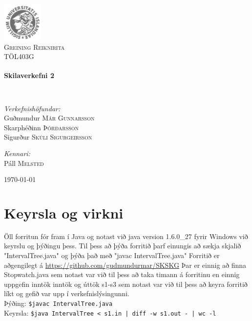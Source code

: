 \documentclass{article}
\begin{document}
\begin {titlepage}
\begin{center}
\includegraphics[width=0.15\textwidth]{./Haskoli_Islands_rett.jpg}~\\[1cm]

\textsc{\LARGE Greining Reiknirita}\\[1.5cm]

\textsc{\Large TÖL403G}\\[0.5cm]

\HRule \\[0.4cm]
{ \huge \bfseries Skilaverkefni 2\\[0.4cm] }

\HRule \\[1.5cm]

\begin{minipage}{0.5\textwidth}
\begin{flushleft} \large
\emph{Verkefnishöfundar:}
\\ Guðmundur\textsc{ Már Gunnarsson }
\\ Skarphéðinn \textsc{Þórðarsson}
\\ Sigurður \textsc{Skúli Sigurgeirsson}

\end{flushleft}
\end{minipage}
\begin{minipage}{0.4\textwidth}
\begin{flushright} \large
\emph{Kennari:} \\
Páll \textsc{Melsted}
\end{flushright}
\end{minipage}

\vfill

{\large \today}

\end{center}

\end{titlepage}

\section {Keyrsla og virkni}
Öll forritun fór fram í Java og notast við java version 1.6.0\_27 fyrir Windows við keyrslu og þýðingu þess. 
Til þess að þýða forritið þarf einungis að sækja skjalið "IntervalTree.java" og þýða það með "javac IntervalTree.java"
Forritið er aðgengilegt á \url{https://github.com/gudmundurmar/SKSKG}
Þar er einnig að finna Stopwatch.java sem notast var við til þess að taka timann á forritinu en einnig uppgefin inntök inntök og úttök s1-s3 sem notast var við til þess að keyra forritið líkt og gefið var upp í verkefnislýsingunni. 
\\ 	Þýðing: \texttt {\$javac IntervalTree.java}
\\ 	Keyrsla: \texttt {\$java IntervalTree < s1.in | diff -w s1.out - | wc -l}
\end{document}
